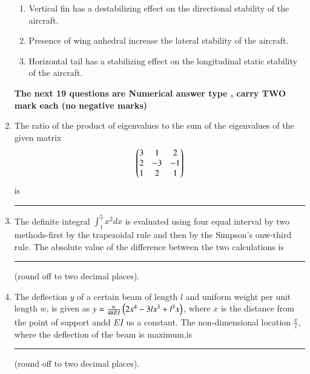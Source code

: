 \documentclass[journal]{IEEEtran}
\begin{document}
\begin{enumerate}
\begin{enumerate}
              \item Vertical fin has a destabilizing effect on the directional stability of the aircraft.
              \item Presence of wing anhedral increase the lateral stability of the aircraft. 
              \item Horizontal tail has a stabilizing effect on the longitudinal static stability of the aircraft.
          \end{enumerate}
\textbf{The next 19 questions are Numerical answer type , carry TWO mark each (no negative marks)}
    \item The ratio of the product of eigenvalues to the sum of the eigenvalues of the given matrix
            \begin{align*}
                \begin{pmatrix}3&1&2\\2&-3&-1\\1&2&1\end{pmatrix}
            \end{align*}
            is \rule{1cm}{0.15mm} 
	\item The definite integral $\int_1^5x^2dx$ is evaluated using four equal interval by two methods-first by the trapezoidal rule and then by the Simpson's onw-third rule. The absolute value of the difference between the two calculations is \rule{1cm}{0.15mm} (round off to two decimal places).
	\item  The deflection $y$ of a certain beam of length $l$ and uniform weight per unit length $w$, is given as $y=\frac{w}{48EI}\left(2x^4-3lx^3+l^3x\right)$, where $x$ is the distance from the point of support andd $EI$ us a constant. The non-dimensional location $\frac{x}{l}$, where the deflection of the beam is maximum,is \rule{1cm}{0.15mm} (round off to two decimal places).  
	
\end{enumerate}	
\end{document}
